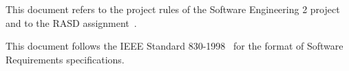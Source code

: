 This document refers to the project rules of the Software Engineering 2 project~\cite{se-project-rules} and to the RASD assignment~\cite{se-assignment}.

This document follows the IEEE Standard 830-1998~\cite{ieee-830-1198} for the format of Software Requirements specifications.